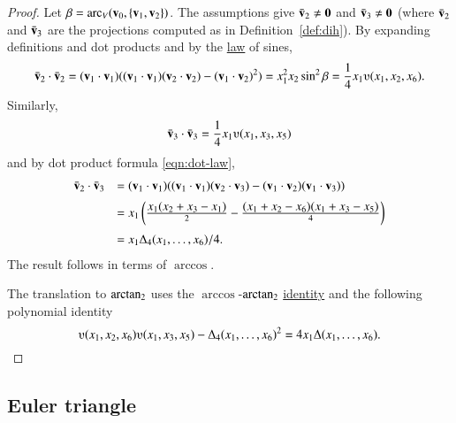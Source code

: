 \begin{proof}
  Let $\beta = \operatorname{arc}_V({\mathbf v}_0,\{{\mathbf v}_1,{\mathbf v}_2\})$.  The assumptions give
  $\bar {{\mathbf v}}_2\ne {\mathbf 0}$ and $\bar {{\mathbf v}}_3 \ne {\mathbf 0}$ (where $\bar {{\mathbf v}}_2$ and
  $\bar {{\mathbf v}}_3$ are the projections computed as in
  Definition~\ref{def:dih}).  %
  By expanding definitions and dot products and by the
  \hyperref[lemma:los]{law} of sines,
\begin{displaymath}
  \bar \v_2\cdot \bar \v_2 = (\v_1\cdot \v_1) ((\v_1\cdot \v_1)(\v_2\cdot \v_2) -
  (\v_1\cdot \v_2)^2) =  x_1^2 x_2 \sin^2 \beta = \frac{1}{4}
  x_1
  \ups(x_1,x_2,x_6).
\end{displaymath}
Similarly,
\begin{displaymath}\bar \v_3 \cdot \bar \v_3 = \frac{1}{4} x_1
  \ups(x_1,x_3,x_5)\end{displaymath}
and by dot product formula \eqref{eqn:dot-law},
\begin{displaymath}\begin{array}{lll}
    \bar \v_2\cdot \bar \v_3 &= (\v_1\cdot \v_1)((\v_1\cdot \v_1)(\v_2\cdot \v_3) -
    (\v_1\cdot \v_2)(\v_1\cdot \v_3) ) \vspace{6pt} \\  &
    = x_1 \left(\frac{\displaystyle x_1 (x_2 + x_3 -
        x_1)}{2} - \frac{\displaystyle (x_1 + x_2 - x_6)(x_1 + x_3 -
        x_5)}{4} \right)\vspace{6pt}\\&
= {x_1\Delta_4(x_1,\ldots,x_6)}/{4}.
\end{array}
\end{displaymath}
The result follows in terms of $\arccos$.

The translation to ${\operatorname{arctan_2}}$ uses the $\arccos$-${\operatorname{arctan_2}}$
\hyperref[lemma:arccos-arctan]{identity} and the following polynomial
identity
\begin{displaymath}
\ups(x_1,x_2,x_6)\ups(x_1,x_3,x_5) - \Delta_4(x_1,\ldots,x_6)^2
= 4 x_1 \Delta(x_1,\ldots,x_6).
\end{displaymath}
\end{proof}

\subsection{Euler triangle}

